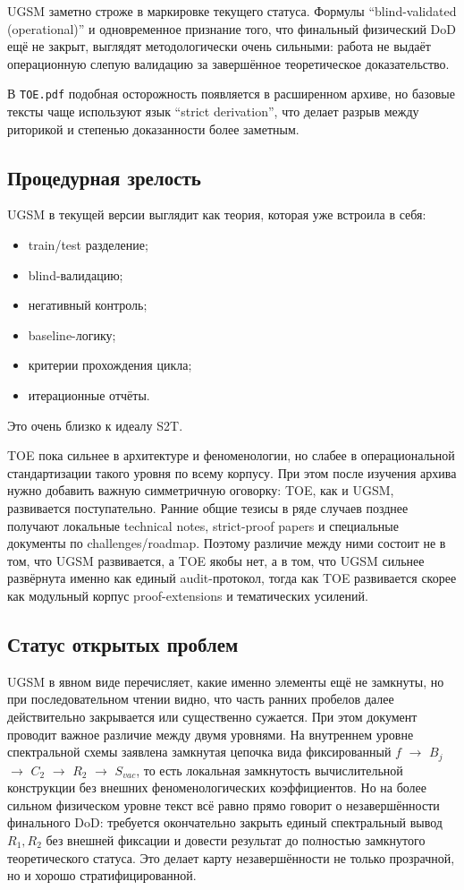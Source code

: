 \documentclass[12pt,a4paper]{article}
\begin{document}
UGSM заметно строже в маркировке текущего статуса. Формулы ``blind-validated (operational)'' и одновременное признание того, что финальный физический DoD ещё не закрыт, выглядят методологически очень сильными: работа не выдаёт операционную слепую валидацию за завершённое теоретическое доказательство.

В \texttt{TOE.pdf} подобная осторожность появляется в расширенном архиве, но базовые тексты чаще используют язык ``strict derivation'', что делает разрыв между риторикой и степенью доказанности более заметным.

\subsection{Процедурная зрелость}

UGSM в текущей версии выглядит как теория, которая уже встроила в себя:
\begin{itemize}
    \item train/test разделение;
    \item blind-валидацию;
    \item негативный контроль;
    \item baseline-логику;
    \item критерии прохождения цикла;
    \item итерационные отчёты.
\end{itemize}

Это очень близко к идеалу S2T.

TOE пока сильнее в архитектуре и феноменологии, но слабее в операциональной стандартизации такого уровня по всему корпусу. При этом после изучения архива нужно добавить важную симметричную оговорку: TOE, как и UGSM, развивается поступательно. Ранние общие тезисы в ряде случаев позднее получают локальные technical notes, strict-proof papers и специальные документы по challenges/roadmap. Поэтому различие между ними состоит не в том, что UGSM развивается, а TOE якобы нет, а в том, что UGSM сильнее развёрнута именно как единый audit-протокол, тогда как TOE развивается скорее как модульный корпус proof-extensions и тематических усилений.

\subsection{Статус открытых проблем}

UGSM в явном виде перечисляет, какие именно элементы ещё не замкнуты, но при последовательном чтении видно, что часть ранних пробелов далее действительно закрывается или существенно сужается. При этом документ проводит важное различие между двумя уровнями. На внутреннем уровне спектральной схемы заявлена замкнутая цепочка вида фиксированный \(f\) $\to$ \(B_j\) $\to$ \(C_2\) $\to$ \(R_2\) $\to$ \(S_{vac}\), то есть локальная замкнутость вычислительной конструкции без внешних феноменологических коэффициентов. Но на более сильном физическом уровне текст всё равно прямо говорит о незавершённости финального DoD: требуется окончательно закрыть единый спектральный вывод \(R_1, R_2\) без внешней фиксации и довести результат до полностью замкнутого теоретического статуса. Это делает карту незавершённости не только прозрачной, но и хорошо стратифицированной.
\end{document}
